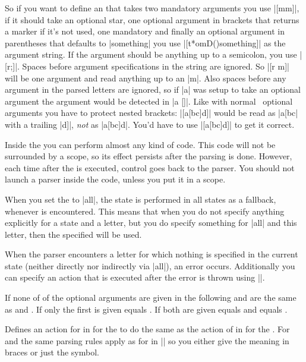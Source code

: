 \begin{command}
  So if you want to define an  that takes two mandatory arguments
  you use |[mm]|, if it should take an optional star, one optional argument in
  brackets that returns a marker if it's not used, one mandatory and finally an
  optional argument in parentheses that defaults to |something| you use
  |[t*omD(){something}]| as the argument string. If the argument should be
  anything up to a semicolon, you use |[r;]|. Spaces before argument
  specifications in the string are ignored. So |[r m]| will be one argument and
  read anything up to an |m|. Also spaces before any argument in the parsed
  letters are ignored, so if |a| was setup to take an optional argument the
  argument would be detected in |a []|. Like with normal \LaTeXe\ optional
  arguments you have to protect nested brackets: |[a[bc]d]| would be read as
  |a[bc| with a trailing |d]|, \emph{not} as |a[bc]d|. You'd have to use
  |[{a[bc]d}]| to get it correct.

  Inside the  you can perform almost any kind of code. This code
  will not be surrounded by a scope, so its effect persists after the parsing
  is done. However, each time after the  is executed, control
  goes back to the parser. You should not launch a parser inside the
   code, unless you put it in a scope.

  When you set the  to |all|, the state  is performed
  in all states as a fallback, whenever  is encountered.
  This means that when you do not specify anything explicitly for a state and a
  letter, but you do specify something for |all| and this letter, then the
  specified  will be used.

  When the parser encounters a letter for which nothing is specified in the
  current state (neither directly nor indirectly via |all|), an error occurs.
  Additionally you can specify an action that is executed after the error is
  thrown using |\pgfparserdefunknown|.
\end{command}

\begin{command}
  {%
    \pgfparserlet
  }
  If none of of the optional arguments are given in the following  and  are the same as  and
  . If only the first is given  equals
  . If both are given  equals  and
   equals .

  Defines an action for  in  for the
   to do the same as the action of 
  in  for the . For 
  and  the same parsing rules apply as for  in |\pgfparserdef| so you either give the meaning in braces or just
  the symbol.
\end{command}

